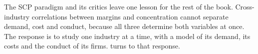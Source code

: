 The SCP paradigm and its critics leave one lesson for the rest of the book. Cross-industry correlations
between margins and concentration cannot separate demand, cost and conduct, because all three determine
both variables at once. The response is to study one industry at a time, with a model of its demand,
its costs and the conduct of its firms.  turns to that response.
